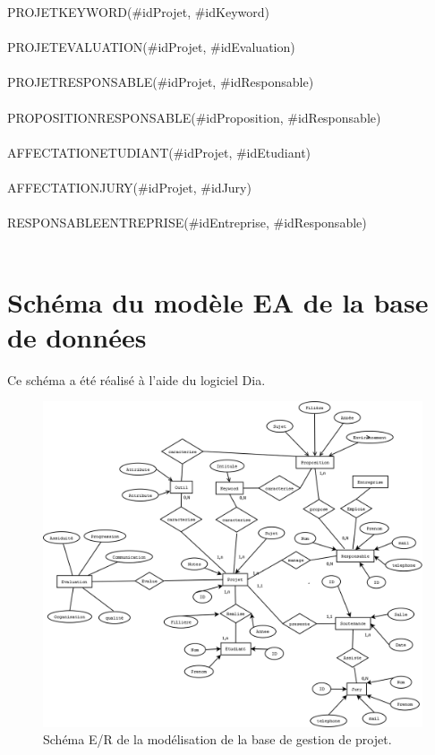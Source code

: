 \documentclass[a4paper,11pt]{report}
\begin{document}
{PROJETKEYWORD(\#idProjet, \#idKeyword) \\ \\
PROJETEVALUATION(\#idProjet, \#idEvaluation) \\ \\
PROJETRESPONSABLE(\#idProjet, \#idResponsable) \\ \\
PROPOSITIONRESPONSABLE(\#idProposition, \#idResponsable) \\ \\
AFFECTATIONETUDIANT(\#idProjet, \#idEtudiant) \\ \\
AFFECTATIONJURY(\#idProjet, \#idJury) \\ \\
RESPONSABLEENTREPRISE(\#idEntreprise, \#idResponsable) \\ \\
}

\section{Schéma du modèle EA de la base de données}

\normalsize{
Ce schéma a été réalisé à l'aide du logiciel Dia.  
}

\begin{figure}[h]
   \begin{center}
   \includegraphics[scale = 0.29]{GestionProjet.png}
   \end{center}
  \caption{Schéma E/R de la modélisation de la base de gestion de projet.}
\end{figure}
\end{document}
